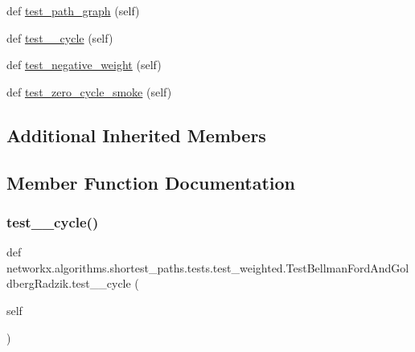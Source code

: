 \begin{DoxyCompactItemize}
def \hyperlink{classnetworkx_1_1algorithms_1_1shortest__paths_1_1tests_1_1test__weighted_1_1TestBellmanFordAndGoldbergRadzik_a33485948ae22f01e011002a9db9fd953}{test\+\_\+path\+\_\+graph} (self)
\item 
def \hyperlink{classnetworkx_1_1algorithms_1_1shortest__paths_1_1tests_1_1test__weighted_1_1TestBellmanFordAndGoldbergRadzik_ae5a830103aa8280e4c95024d3e35cfae}{test\+\_\+\_\+cycle} (self)
\item 
def \hyperlink{classnetworkx_1_1algorithms_1_1shortest__paths_1_1tests_1_1test__weighted_1_1TestBellmanFordAndGoldbergRadzik_a68648d6b89bbcf557a3eac7a3d444707}{test\+\_\+negative\+\_\+weight} (self)
\item 
def \hyperlink{classnetworkx_1_1algorithms_1_1shortest__paths_1_1tests_1_1test__weighted_1_1TestBellmanFordAndGoldbergRadzik_a567234b75b82b64777159b174a7c4701}{test\+\_\+zero\+\_\+cycle\+\_\+smoke} (self)
\end{DoxyCompactItemize}
\subsection*{Additional Inherited Members}


\subsection{Member Function Documentation}
\mbox{\label{classnetworkx_1_1algorithms_1_1shortest__paths_1_1tests_1_1test__weighted_1_1TestBellmanFordAndGoldbergRadzik_ae5a830103aa8280e4c95024d3e35cfae}} 
\subsubsection{\texorpdfstring{test\+\_\+\_\+cycle()}{test\_4\_cycle()}}
{\footnotesize\ttfamily def networkx.\+algorithms.\+shortest\+\_\+paths.\+tests.\+test\+\_\+weighted.\+Test\+Bellman\+Ford\+And\+Goldberg\+Radzik.\+test\+\_\+\_\+cycle (\begin{DoxyParamCaption}\item[{}]{self }\end{DoxyParamCaption})}


